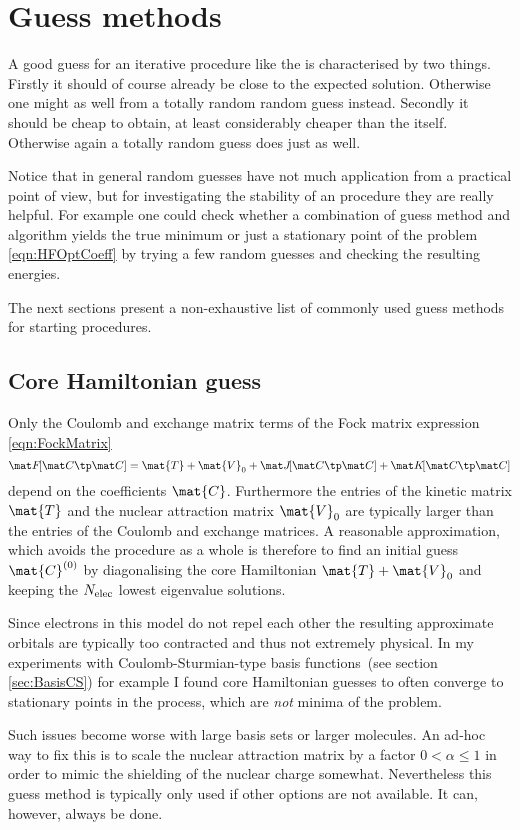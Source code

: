 \section{Guess methods}
A good guess for an iterative procedure like the \SCF
is characterised by two things.
Firstly it should of course already be close to the expected solution.
Otherwise one might as well from a totally random random guess instead.
Secondly it should be cheap to obtain,
at least considerably cheaper than the \SCF itself.
Otherwise again a totally random guess does just as well.

Notice that in general random guesses have not much application
from a practical point of view,
but for investigating the stability of an \SCF procedure
they are really helpful.
For example one could check whether a combination of guess method
and \SCF algorithm yields the true minimum or just a stationary
point of the \HF problem \eqref{eqn:HFOptCoeff}
by trying a few random guesses and checking the resulting energies.

The next sections present a non-exhaustive list of
commonly used guess methods for starting \SCF procedures.

\subsection{Core Hamiltonian guess}
\label{sec:CoreHamiltonian}
Only the Coulomb and exchange matrix terms of the Fock matrix
expression \eqref{eqn:FockMatrix}
\[ \matFfull = \mat{T} + \mat{V}_0 + \matJfull + \matKfull \]
depend on the coefficients $\mat{C}$.
Furthermore the entries of the kinetic matrix $\mat{T}$
and the nuclear attraction matrix $\mat{V}_0$
are typically larger than the entries of the Coulomb and exchange matrices.
A reasonable approximation,
which avoids the \SCF procedure as a whole
is therefore to find an initial guess $\mat{C}^{(0)}$
by diagonalising the core Hamiltonian $\mat{T} + \mat{V}_0$
and keeping the $N_\text{elec}$ lowest eigenvalue solutions.

Since electrons in this model do not repel each other
the resulting approximate orbitals are typically too contracted
and thus not extremely physical.
In my experiments with Coulomb-Sturmian-type
basis functions~(see section \ref{sec:BasisCS})
for example I found core Hamiltonian guesses to often
converge to stationary points in the \SCF process,
which are \emph{not} minima of the \HF problem.

Such issues become worse with large basis sets or larger molecules.
An ad-hoc way to fix this is to scale the nuclear attraction
matrix by a factor $0 < \alpha \leq 1$
in order to mimic the shielding of the nuclear charge somewhat.
Nevertheless this guess method is typically only used
if other options are not available.
It can, however, always be done.

